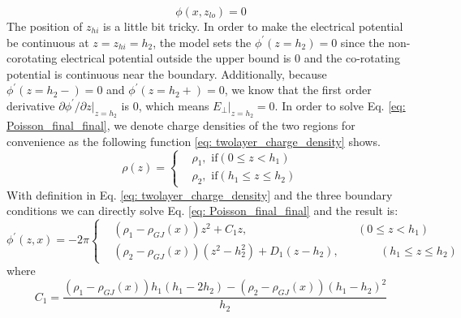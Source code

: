 \documentclass[12pt]{report}
\begin{document}
      \begin{equation}
        \label{eq: lower_boundary}
        \phi \left(x, z_{lo}\right) = 0
      \end{equation}
      The position of $z_{hi}$ is a little bit tricky. In order to make the electrical potential be 
      continuous at $z = z_{hi} = h_2$, the model sets the $\phi^{\prime}\left(z=h_{2}\right) = 0$ since the 
      non-corotating electrical potential outside the upper bound is $0$ and the co-rotating potential
      is continuous near the boundary. Additionally, because $\phi^{\prime}\left(z=h_{2}-\right) = 0$
      and $\phi^{\prime}\left(z=h_{2}+\right) = 0$, we know that the first order derivative 
      $\partial{\phi^{\prime}}/\partial{z}\vert_{z=h_{2}}$ is $0$, which means 
      $E_{\perp}\vert_{z=h_{2}} = 0$. 
      In order to solve Eq. \ref{eq: Poisson_final_final}, we denote charge densities of
      the two regions for convenience as the following function 
      \ref{eq: twolayer_charge_density} shows.
      \begin{equation}
        \label{eq: twolayer_charge_density}
          \rho\left(z\right) = 
          \begin{cases}
             & \rho_{1} , \text{    if} \left(0 \leq z < h_{1}\right)\\
             & \rho_{2} , \text{    if} \left(h_{1} \leq z \leq h_{2}\right) 
          \end{cases}       
      \end{equation}
      With definition in Eq. \ref{eq: twolayer_charge_density} and the three boundary conditions
      we can directly solve Eq. \ref{eq: Poisson_final_final} and the result is:
      \begin{equation}
        \label{eq: twolayer_potential}
          \phi^{\prime}\left(z, x\right) = -2\pi
          \left\{\begin{alignedat}{2}
             & \left(\rho_{1} - \rho_{GJ}\left(x\right)\right)z^2 + C_{1} z ,  &&\left(0 \leq z < h_{1}\right)\\
             & \left(\rho_{2}-\rho_{GJ}\left(x\right)\right)\left(z^2 - h_2^2\right) + D_{1} \left(z-h_2\right),  &&\qquad \left(h_{1} \leq z \leq h_{2}\right) 
          \end{alignedat}\right.
      \end{equation}
      where 
      \begin{equation*}
        C_{1} = \frac{\left(\rho_{1}-\rho_{GJ}\left(x\right)\right)h_1\left(h_1-2h_2\right)-\left(\rho_2-\rho_{GJ}\left(x\right)\right)\left(h_1-h_2\right)^2}{h_2} 
      \end{equation*}
\end{document}
